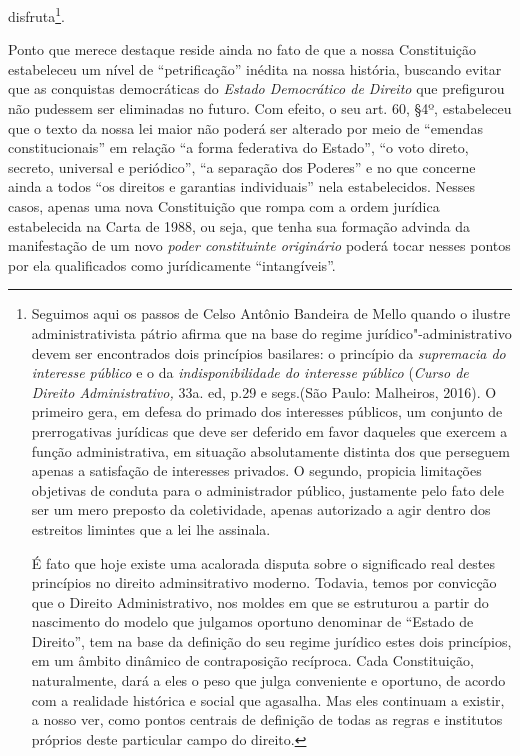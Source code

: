 disfruta\footnote{Seguimos aqui os passos de Celso Antônio Bandeira de
  Mello quando o ilustre administrativista pátrio afirma que na base do
  regime jurídico"-administrativo devem ser encontrados dois princípios
  basilares: o princípio da \emph{supremacia do interesse público} e o
  da \emph{indisponibilidade do interesse público} (\emph{Curso de
  Direito Administrativo,} 33a. ed, p.29 e segs.(São Paulo: Malheiros,
  2016). O primeiro gera, em defesa do primado dos interesses públicos,
  um conjunto de prerrogativas jurídicas que deve ser deferido em favor
  daqueles que exercem a função administrativa, em situação
  absolutamente distinta dos que perseguem apenas a satisfação de
  interesses privados. O segundo, propicia limitações objetivas de
  conduta para o administrador público, justamente pelo fato dele ser um
  mero preposto da coletividade, apenas autorizado a agir dentro dos
  estreitos limintes que a lei lhe assinala.

  É fato que hoje existe uma acalorada disputa sobre o significado real
  destes princípios no direito adminsitrativo moderno. Todavia, temos
  por convicção que o Direito Administrativo, nos moldes em que se
  estruturou a partir do nascimento do modelo que julgamos oportuno
  denominar de ``Estado de Direito'', tem na base da definição do
  seu regime jurídico estes dois princípios, em um âmbito dinâmico de
  contraposição recíproca. Cada Constituição, naturalmente, dará a eles
  o peso que julga conveniente e oportuno, de acordo com a realidade
  histórica e social que agasalha. Mas eles continuam a existir, a nosso
  ver, como pontos centrais de definição de todas as regras e institutos
  próprios deste particular campo do direito.}.

Ponto que merece destaque reside ainda no fato de que a nossa
Constituição estabeleceu um nível de ``petrificação'' inédita na nossa
história, buscando evitar que as conquistas democráticas do \emph{Estado
Democrático de Direito} que prefigurou não pudessem ser eliminadas no
futuro. Com efeito, o seu art. 60, §4º, estabeleceu que o texto da nossa
lei maior não poderá ser alterado por meio de ``emendas
constitucionais'' em relação ``a forma federativa do Estado'',
``o voto direto, secreto, universal e periódico'', ``a
separação dos Poderes'' e no que concerne ainda a todos ``os
direitos e garantias individuais'' nela estabelecidos. Nesses casos,
apenas uma nova Constituição que rompa com a ordem jurídica estabelecida
na Carta de 1988, ou seja, que tenha sua formação advinda da
manifestação de um novo \emph{poder constituinte originário} poderá
tocar nesses pontos por ela qualificados como jurídicamente
``intangíveis''.

